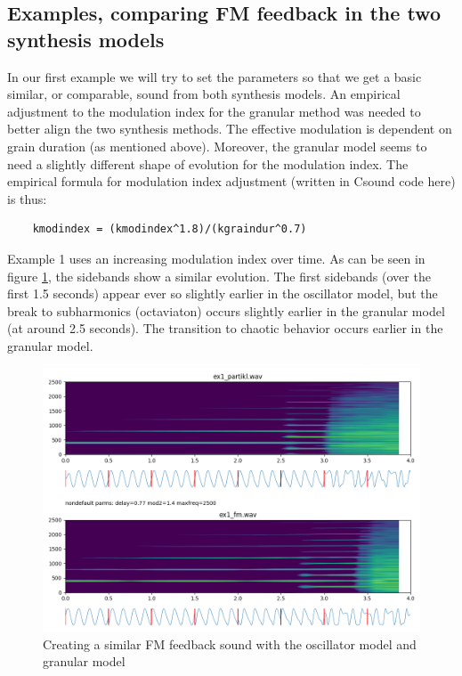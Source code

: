 \documentclass[runningheads,a4paper]{llncs}
\begin{document}
\subsection{Examples, comparing FM feedback in the two synthesis models}
In our first example we will try to set the parameters so that we get a basic similar, or comparable, sound from both synthesis models. An empirical adjustment to the modulation index for the granular method was needed to better align the two synthesis methods. The effective modulation is dependent on grain duration (as mentioned above). Moreover, the granular model seems to need a slightly different shape of evolution for the modulation index. The empirical formula for modulation index adjustment (written in Csound code here) is thus:  

\begin{lstlisting}
	kmodindex = (kmodindex^1.8)/(kgraindur^0.7) 
\end{lstlisting}

Example 1 uses an increasing modulation index over time. As can be seen in figure \ref{fig:ex1}, the sidebands show a similar evolution. The first sidebands (over the first 1.5 seconds) appear ever so slightly earlier in the oscillator model, but the break to subharmonics (octaviaton) occurs slightly earlier in the granular model (at around 2.5 seconds). The transition to chaotic behavior occurs earlier in the granular model. 

\begin{figure}[h]
	\centering
	\includegraphics[width=.95\textwidth]{ex1_compare.png}
	\caption{Creating a similar FM feedback sound with the oscillator model and granular model}
	\label{fig:ex1}
\end{figure}
\end{document}
